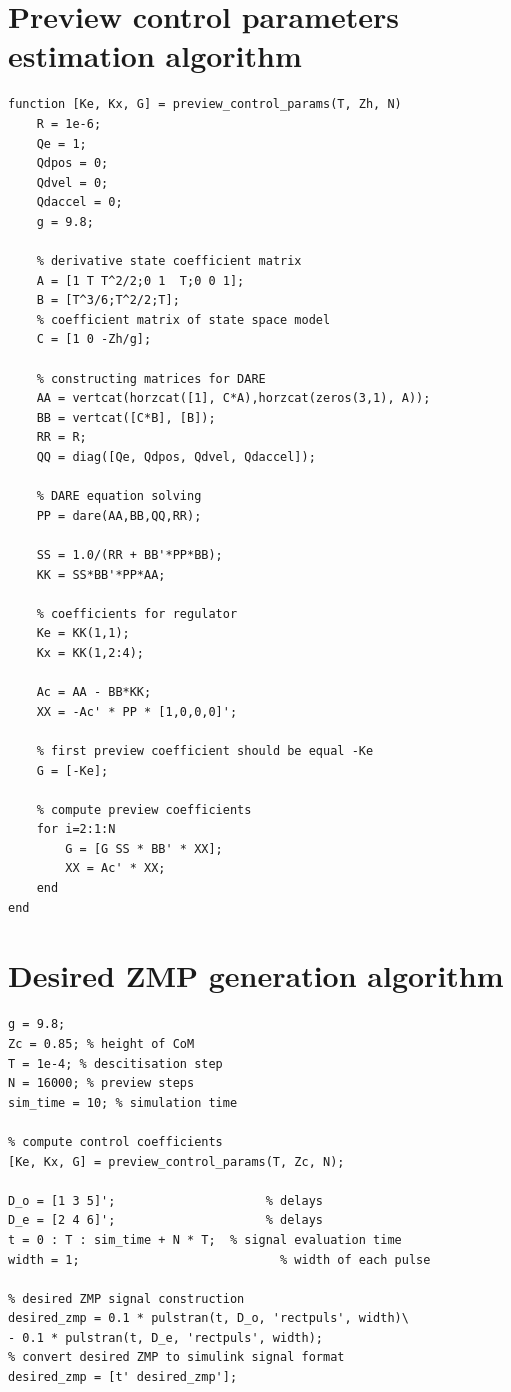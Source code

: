 \documentclass[12pt,a4paper]{report}
\begin{document}
	\begin{appendices}
		\chapter{Preview control parameters estimation algorithm}
			\begin{lstlisting}
function [Ke, Kx, G] = preview_control_params(T, Zh, N)
	R = 1e-6;
	Qe = 1;
	Qdpos = 0;
	Qdvel = 0;
	Qdaccel = 0;
	g = 9.8;
	
	% derivative state coefficient matrix
	A = [1 T T^2/2;0 1  T;0 0 1];
	B = [T^3/6;T^2/2;T];
	% coefficient matrix of state space model
	C = [1 0 -Zh/g];
	
	% constructing matrices for DARE
	AA = vertcat(horzcat([1], C*A),horzcat(zeros(3,1), A));
	BB = vertcat([C*B], [B]);
	RR = R;
	QQ = diag([Qe, Qdpos, Qdvel, Qdaccel]);
	
	% DARE equation solving
	PP = dare(AA,BB,QQ,RR);
	
	SS = 1.0/(RR + BB'*PP*BB);
	KK = SS*BB'*PP*AA;
	
	% coefficients for regulator
	Ke = KK(1,1);
	Kx = KK(1,2:4);
	
	Ac = AA - BB*KK;
	XX = -Ac' * PP * [1,0,0,0]';
	
	% first preview coefficient should be equal -Ke
	G = [-Ke];
	
	% compute preview coefficients
	for i=2:1:N
		G = [G SS * BB' * XX];
		XX = Ac' * XX;
	end
end
			\end{lstlisting}
		\chapter{Desired ZMP generation algorithm}
			\begin{lstlisting}
g = 9.8;
Zc = 0.85; % height of CoM
T = 1e-4; % descitisation step
N = 16000; % preview steps
sim_time = 10; % simulation time

% compute control coefficients
[Ke, Kx, G] = preview_control_params(T, Zc, N);

D_o = [1 3 5]';                     % delays
D_e = [2 4 6]';                     % delays
t = 0 : T : sim_time + N * T;  % signal evaluation time
width = 1;                            % width of each pulse

% desired ZMP signal construction
desired_zmp = 0.1 * pulstran(t, D_o, 'rectpuls', width)\
- 0.1 * pulstran(t, D_e, 'rectpuls', width);
% convert desired ZMP to simulink signal format
desired_zmp = [t' desired_zmp'];
			\end{lstlisting}
	\end{appendices}
  
\end{document}
